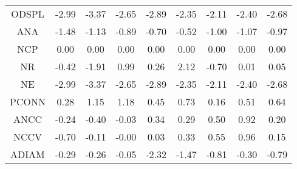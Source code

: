 \begin{longtable}{ | c || c | c | c | c | c | c | c || c |}
ODSPL &  \cellcolor[HTML]{FFB7B7} -2.99 &  \cellcolor[HTML]{FFA7A7} -3.37 &  \cellcolor[HTML]{FFBFBF} -2.65 &  \cellcolor[HTML]{FFB7B7} -2.89 &  \cellcolor[HTML]{FFC7C7} -2.35 &  \cellcolor[HTML]{FFC7C7} -2.11 &  \cellcolor[HTML]{FFBFBF} -2.40 &  \cellcolor[HTML]{FFBFBF} -2.68 \\
ANA &  \cellcolor[HTML]{FFD7D7} -1.48 &  \cellcolor[HTML]{FFDFDF} -1.13 &  \cellcolor[HTML]{FFE7E7} -0.89 &  \cellcolor[HTML]{FFEFEF} -0.70 &  \cellcolor[HTML]{FFEFEF} -0.52 &  \cellcolor[HTML]{FFE7E7} -1.00 &  \cellcolor[HTML]{FFE7E7} -1.07 &  \cellcolor[HTML]{FFE7E7} -0.97 \\
NCP &  \cellcolor[HTML]{FFFFFF} 0.00 &  \cellcolor[HTML]{FFFFFF} 0.00 &  \cellcolor[HTML]{FFFFFF} 0.00 &  \cellcolor[HTML]{FFFFFF} 0.00 &  \cellcolor[HTML]{FFFFFF} 0.00 &  \cellcolor[HTML]{FFFFFF} 0.00 &  \cellcolor[HTML]{FFFFFF} 0.00 &  \cellcolor[HTML]{FFFFFF} 0.00 \\
NR &  \cellcolor[HTML]{FFF7F7} -0.42 &  \cellcolor[HTML]{FFCFCF} -1.91 &  \cellcolor[HTML]{E7E7FF} 0.99 &  \cellcolor[HTML]{F7F7FF} 0.26 &  \cellcolor[HTML]{C7C7FF} 2.12 &  \cellcolor[HTML]{FFEFEF} -0.70 &  \cellcolor[HTML]{FFFFFF} 0.01 &  \cellcolor[HTML]{FFFFFF} 0.05 \\
NE &  \cellcolor[HTML]{FFB7B7} -2.99 &  \cellcolor[HTML]{FFA7A7} -3.37 &  \cellcolor[HTML]{FFBFBF} -2.65 &  \cellcolor[HTML]{FFB7B7} -2.89 &  \cellcolor[HTML]{FFC7C7} -2.35 &  \cellcolor[HTML]{FFC7C7} -2.11 &  \cellcolor[HTML]{FFBFBF} -2.40 &  \cellcolor[HTML]{FFBFBF} -2.68 \\
PCONN &  \cellcolor[HTML]{F7F7FF} 0.28 &  \cellcolor[HTML]{DFDFFF} 1.15 &  \cellcolor[HTML]{DFDFFF} 1.18 &  \cellcolor[HTML]{F7F7FF} 0.45 &  \cellcolor[HTML]{EFEFFF} 0.73 &  \cellcolor[HTML]{F7F7FF} 0.16 &  \cellcolor[HTML]{EFEFFF} 0.51 &  \cellcolor[HTML]{EFEFFF} 0.64 \\
ANCC &  \cellcolor[HTML]{FFF7F7} -0.24 &  \cellcolor[HTML]{FFF7F7} -0.40 &  \cellcolor[HTML]{FFFFFF} -0.03 &  \cellcolor[HTML]{F7F7FF} 0.34 &  \cellcolor[HTML]{F7F7FF} 0.29 &  \cellcolor[HTML]{EFEFFF} 0.50 &  \cellcolor[HTML]{E7E7FF} 0.92 &  \cellcolor[HTML]{F7F7FF} 0.20 \\
NCCV &  \cellcolor[HTML]{FFEFEF} -0.70 &  \cellcolor[HTML]{FFFFFF} -0.11 &  \cellcolor[HTML]{FFFFFF} -0.00 &  \cellcolor[HTML]{FFFFFF} 0.03 &  \cellcolor[HTML]{F7F7FF} 0.33 &  \cellcolor[HTML]{EFEFFF} 0.55 &  \cellcolor[HTML]{E7E7FF} 0.96 &  \cellcolor[HTML]{FFFFFF} 0.15 \\
ADIAM &  \cellcolor[HTML]{FFF7F7} -0.29 &  \cellcolor[HTML]{FFF7F7} -0.26 &  \cellcolor[HTML]{FFFFFF} -0.05 &  \cellcolor[HTML]{FFC7C7} -2.32 &  \cellcolor[HTML]{FFD7D7} -1.47 &  \cellcolor[HTML]{FFE7E7} -0.81 &  \cellcolor[HTML]{FFF7F7} -0.30 &  \cellcolor[HTML]{FFEFEF} -0.79 \\

\end{longtable}
